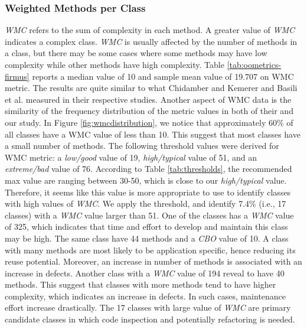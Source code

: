 \subsubsection{Weighted Methods per Class}
\textit{WMC} refers to the sum of complexity in each method. A greater value of \textit{WMC} indicates a complex class. \textit{WMC} is usually affected by the number of methods in a class, but there may be some cases where some methods may have low complexity while other methods have high complexity. Table \ref{tab:oometrics-firmus} reports a median value of 10 and sample mean value of 19.707 on WMC metric. The results are quite similar to what Chidamber and Kemerer\cite{chidamber1994metrics} and Basili et al.\cite{basili1996validation} measured in their respective studies. Another aspect of WMC data is the similarity of the frequency distribution of the metric values in both of their and our study. In Figure \ref{fig:wmcdistribution}, we notice that approximately 60\% of all classes have a WMC value of less than 10. This suggest that most classes have a small number of methods. The following threshold values were derived for WMC metric: a \textit{low/good} value of 19, \textit{high/typical} value of 51, and an \textit{extreme/bad} value of 76. According to Table \ref{tab:thresholds}, the recommended max value are ranging between 30-50, which is close to our \textit{high/typical} value. Therefore, it seems like this value is more appropriate to use to identify classes with high values of \textit{WMC}. We apply the threshold, and identify 7.4\% (i.e., 17 classes) with a \textit{WMC} value larger than 51. One of the classes has a \textit{WMC} value of 325, which indicates that time and effort to develop and maintain this class may be high. The same class have 44 methods and a \textit{CBO} value of 10. A class with many methods are most likely to be application specific, hence reducing its reuse potential. Moreover, an increase in number of methods is associated with an increase in defects\cite{subramanyam2003empirical}. Another class with a \textit{WMC} value of 194 reveal to have 40 methods. This suggest that classes with more methods tend to have higher complexity, which indicates an increase in defects. In such cases, maintenance effort increase drastically. The 17 classes with large value of \textit{WMC} are primary candidate classes in which code inspection and potentially refactoring is needed.





